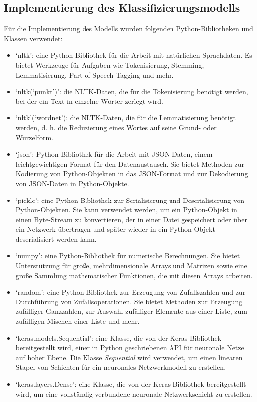 \subsection{Implementierung des Klassifizierungsmodells}
Für die Implementierung des Modells wurden folgenden Python-Bibliotheken und Klassen verwendet:
\begin{itemize}
    \item `nltk': eine Python-Bibliothek für die Arbeit mit natürlichen Sprachdaten. Es bietet Werkzeuge für Aufgaben wie Tokenisierung, Stemming, Lemmatisierung, Part-of-Speech-Tagging und mehr.
    \item `nltk(`punkt')': die \ac{NLTK}-Daten, die für die Tokenisierung benötigt werden, bei der ein Text in einzelne Wörter zerlegt wird.
    \item `nltk'(`wordnet'): die \ac{NLTK}-Daten, die für die Lemmatisierung benötigt werden, d. h. die Reduzierung eines Wortes auf seine Grund- oder Wurzelform.
    \item `json': Python-Bibliothek für die Arbeit mit \ac{JSON}-Daten, einem leichtgewichtigen Format für den Datenaustausch. Sie bietet Methoden zur Kodierung von Python-Objekten in das \ac{JSON}-Format und zur Dekodierung von \ac{JSON}-Daten in Python-Objekte.
    \item `pickle': eine Python-Bibliothek zur Serialisierung und Deserialisierung von Python-Objekten. Sie kann verwendet werden, um ein Python-Objekt in einen Byte-Stream zu konvertieren, der in einer Datei gespeichert oder über ein Netzwerk übertragen und später wieder in ein Python-Objekt deserialisiert werden kann.
    \item `numpy': eine Python-Bibliothek für numerische Berechnungen. Sie bietet Unterstützung für große, mehrdimensionale Arrays und Matrizen sowie eine große Sammlung mathematischer Funktionen, die mit diesen Arrays arbeiten.
    \item `random': eine Python-Bibliothek zur Erzeugung von Zufallszahlen und zur Durchführung von Zufallsoperationen. Sie bietet Methoden zur Erzeugung zufälliger Ganzzahlen, zur Auswahl zufälliger Elemente aus einer Liste, zum zufälligen Mischen einer Liste und mehr.
    \item `keras.models.Sequential': eine Klasse, die von der Keras-Bibliothek bereitgestellt wird, einer in Python geschriebenen \ac{API} für neuronale Netze auf hoher Ebene. Die Klasse \textit{Sequential} wird verwendet, um einen linearen Stapel von Schichten für ein neuronales Netzwerkmodell zu erstellen.
    \item `keras.layers.Dense': eine Klasse, die von der Keras-Bibliothek bereitgestellt wird, um eine vollständig verbundene neuronale Netzwerkschicht zu erstellen.

\end{itemize}

